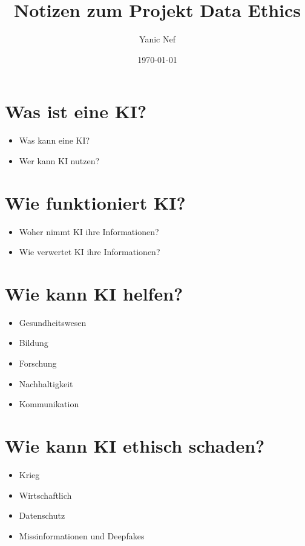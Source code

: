 \documentclass{article}
\title{Notizen zum Projekt Data Ethics}
\author{Yanic Nef}
\date{\today}
\begin{document}
\maketitle


\tableofcontents



\section{Was ist eine KI?}
\begin{itemize}
    \item Was kann eine KI?
    \item Wer kann KI nutzen?
\end{itemize}

\section{Wie funktioniert KI?}
\begin{itemize}
    \item Woher nimmt KI ihre Informationen?
    \item Wie verwertet KI ihre Informationen?
\end{itemize}

\section{Wie kann KI helfen?}
\begin{itemize}
\item Gesundheitswesen
\item Bildung
\item Forschung
\item Nachhaltigkeit
\item Kommunikation
\end{itemize}

\section{Wie kann KI ethisch schaden?}
\begin{itemize}
    \item Krieg
    \item Wirtschaftlich
    \item Datenschutz
    \item Missinformationen und Deepfakes
\end{itemize}



\printbibliography
\end{document}
